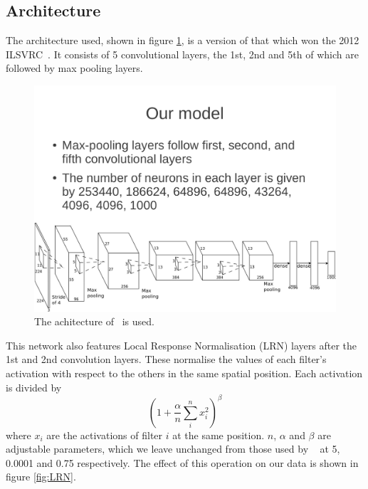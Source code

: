 \documentclass[11pt]{article} %
\begin{document}
\subsection{Architecture}



\label{sec:alexNet}

The architecture used, shown in figure \ref{fig:alexNet}, is a version of that which won the 2012 ILSVRC~\cite{Krizhevsky2012}. It consists of 5 convolutional layers, the 1st, 2nd and 5th of which are followed by max pooling layers. 

\begin{figure}
\centering
\includegraphics*[width=\linewidth,trim={0cm 0cm 0.79cm 12cm},clip]{alexNet} 
\caption{ The achitecture of~\cite{Krizhevsky2012} is used.\label{fig:alexNet}}
\end{figure}



This network also features Local Response Normalisation (LRN) layers after the 1st and 2nd convolution layers. These normalise the values of each filter's activation with respect to the others in the same spatial position. Each activation is divided by
\begin{equation}
(1 + \frac{\alpha}{n} \sum_i^n x_i^2)^\beta
\end{equation}
where $x_i$ are the activations of filter $i$ at the same position. $n$, $\alpha$ and $\beta$ are adjustable parameters, which we leave unchanged from those used by ~\cite{Krizhevsky2012} at 5, 0.0001 and 0.75 respectively. The effect of this operation on our data is shown in figure \ref{fig:LRN}. 
\end{document}
